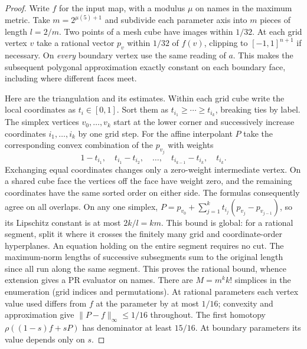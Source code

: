 \begin{proof}
Write $f$ for the input map, with a modulus $\mu$ on names in the maximum
metric. Take $m=2^{\mu(5)+1}$ and subdivide each parameter axis into $m$
pieces of length $l=2/m$. Two points of a mesh cube have images within
$1/32$. At each grid vertex $v$ take a rational vector $p_v$ within $1/32$
of $f(v)$, clipping to $[-1,1]^{n+1}$ if necessary. On \emph{every}
boundary vertex use the same reading of $a$. This makes the subsequent
polygonal approximation exactly constant on each boundary face, including
where different faces meet.

Here are the triangulation and its estimates. Within each grid cube write
the local coordinates as $t_i\in[0,1]$. Sort them as
$t_{i_1}\ge\cdots\ge t_{i_k}$, breaking ties by label. The simplex
vertices $v_0,\ldots,v_k$ start at the lower corner and successively
increase coordinates $i_1,\ldots,i_k$ by one grid step. For the affine
interpolant $P$ take the corresponding convex combination of the $p_{v_j}$
with weights
\[
 1-t_{i_1},\quad t_{i_1}-t_{i_2},\quad\ldots,\quad
 t_{i_{k-1}}-t_{i_k},\quad t_{i_k}.
\]
Exchanging equal coordinates changes only a zero-weight intermediate
vertex. On a shared cube face the vertices off the face have weight zero,
and the remaining coordinates have the same sorted order on either side.
The formulas consequently agree on all overlaps. On any one simplex,
$P=p_{v_0}+\sum_{j=1}^k t_{i_j}(p_{v_j}-p_{v_{j-1}})$, so its
Lipschitz constant is at most $2k/l=km$. This bound is global: for a
rational segment, split it where it crosses the finitely many grid and
coordinate-order hyperplanes. An equation holding on the entire segment
requires no cut. The maximum-norm lengths of successive subsegments sum
to the original length since all run along the same segment. This proves
the rational bound, whence extension gives a PR evaluator on names.
There are $M=m^k k!$ simplices in the enumeration (grid indices and
permutations). At rational parameters each vertex value used differs from
$f$ at the parameter by at most $1/16$; convexity and approximation give
$\|P-f\|_\infty\le1/16$ throughout. The first homotopy
$\rho((1-s)f+sP)$ has denominator at least $15/16$. At boundary
parameters its value depends only on $s$.


\end{proof}
